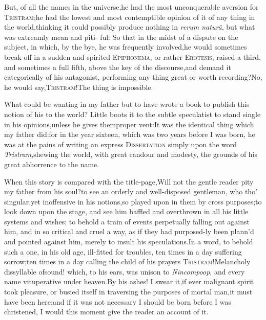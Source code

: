 \documentclass{article}
\begin{document}
But, of all the names in the universe,\break he had the most unconquerable aversion for
\textsc{Tristram};\tsk  he had the lowest and most contemptible opinion
of it of any thing in the world,\tsk  thinking it could possibly produce
nothing in \textit{rerum naturâ}, but what was extreamly mean and piti-\pb
ful: So
that in the midst of a dispute on the subject, in which, by the bye, he was
frequently involved,\tsh  he would sometimes break off in a sudden and
spirited \textsc{Epiphonema}, or rather \textsc{Erotesis}, raised a
third, and sometimes a full fifth, above the key of the
discourse,\tsh  and demand it categorically of his antagonist,
performing any thing great or worth
re\-cording?\tsk  No\tsk, he would
say,\tsk  \textsc{Tri\-stram}!\tsk  The thing is impossible.

What could be wanting in my father but to have wrote a book to
publish this notion of his to the world? Little boots it to the
subtle speculatist to stand single in his opinions,\tsk  unless he
gives them\pb proper vent:\tsk  It was the identical thing which my
father did:\tsk  for in the year sixteen, which was two years
before I was born, he was at the pains of writing an express
\textsc{Dissertation} simply upon the word
\textit{Tristram},\tsk  shewing the world, with great candour and
modesty, the grounds of his great abhorrence to the name.

When this story is compared with the title-page,\tsk  Will not
the gentle reader pity my father from his soul?\tsk  to see an\break
orderly and well-disposed gentleman, who tho’
singular,\tsk  yet inoffensive in his no\-tions,\tsk  so played
upon in them by cross purposes;\tsh  to look down upon
the stage, and see him baffled and overthrown in all his
little systems and wishes; to behold a train of events perpetually
falling out against him, and in so critical and cruel a way, as if
they had purposed-\pb ly been plann’d and pointed ag\-ainst him,
merely to insult his speculations.\tsh  In a word, to
behold such a one, in his old age, ill-fitted for troubles, ten
times in a day suffering sorrow;\tsk  ten times in a day calling
the child of his prayers \textsc{Tristram}!\tsk  Melancholy
dissyllable of\break sound! which, to his ears, was unison to
\textit{Nincompoop}, and every name vituperative under
heaven.\tsh  By his ashes! I swear it,\tsk  if ever
malignant spirit took pleasure, or busied itself in traversing the
purposes of mortal man,\tsk  it must have been here;\tsk  and if
it was not necessary I should be born before I was christened, I
would this moment give the reader an account of it.
\end{document}
